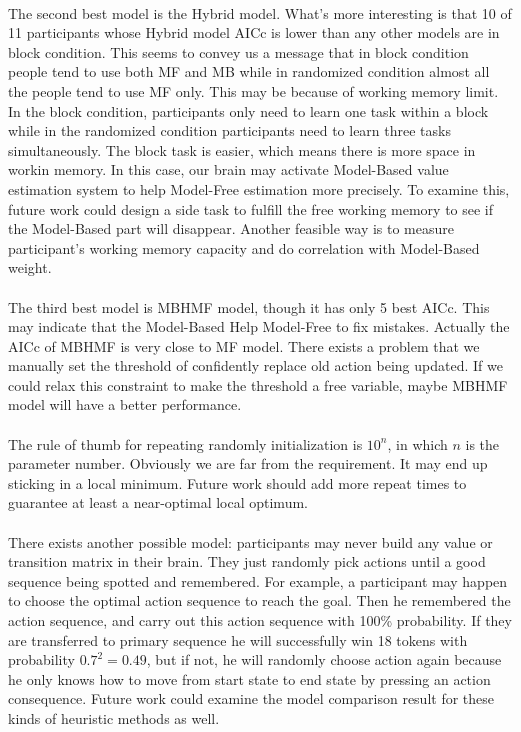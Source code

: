 \paragraph{}
The second best model is the Hybrid model. What's more interesting is that 10 of 11 participants whose Hybrid model AICc is lower than any other models are in block condition. This seems to convey us a message that in block condition people tend to use both MF and MB while in randomized condition almost all the people tend to use MF only. This may be because of working memory limit. In the block condition, participants only need to learn one task within a block while in the randomized condition participants need to learn three tasks simultaneously. The block task is easier, which means there is more space in workin memory. In this case, our brain may activate Model-Based value estimation system to help Model-Free estimation more precisely. To examine this, future work could design a side task to fulfill the free working memory to see if the Model-Based part will disappear. Another feasible way is to measure participant's working memory capacity and do correlation with Model-Based weight. 
\paragraph{}
The third best model is MBHMF model, though it has only 5 best AICc. This may indicate that the Model-Based Help Model-Free to fix mistakes. Actually the AICc of MBHMF is very close to MF model. There exists a problem that we manually set the threshold of confidently replace old action being updated. If we could relax this constraint to make the threshold a free variable, maybe MBHMF model will have a better performance. 
\paragraph{}
The rule of thumb for repeating randomly initialization is $10^n$, in which $n$ is the parameter number. Obviously we are far from the requirement. It may end up sticking in a local minimum. Future work should add more repeat times to guarantee at least a near-optimal local optimum. 
\paragraph{}
There exists another possible model: participants may never build any value or transition matrix in their brain. They just randomly pick actions until a good sequence being spotted and remembered. For example, a participant may happen to choose the optimal action sequence to reach the goal. Then he remembered the action sequence, and carry out this action sequence with 100\% probability. If they are transferred to primary sequence he will successfully win 18 tokens with probability $0.7^2=0.49$, but if not, he will randomly choose action again because he only knows how to move from start state to end state by pressing an action consequence. Future work could examine the model comparison result for these kinds of heuristic methods as well. 


